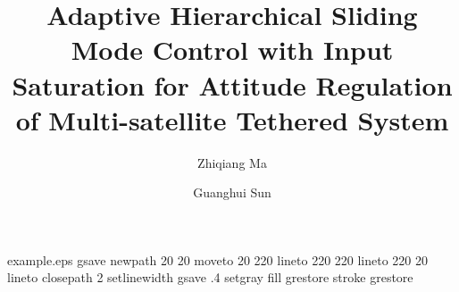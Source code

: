 %
%
%
%
%
\begin{filecontents*}{example.eps}
gsave
newpath
  20 20 moveto
  20 220 lineto
  220 220 lineto
  220 20 lineto
closepath
2 setlinewidth
gsave
  .4 setgray fill
grestore
stroke
grestore
\end{filecontents*}
%
\RequirePackage{fix-cm}
%
\documentclass[smallcondensed]{svjour3}     %
%
\smartqed  %
%
\usepackage{graphicx}
\usepackage{amsmath}
\usepackage{color}

%
%
%
%
%


\title{Adaptive Hierarchical Sliding Mode Control with Input Saturation for Attitude Regulation of Multi-satellite Tethered System%
}


\author{Zhiqiang Ma         \and
        Guanghui Sun %
}

